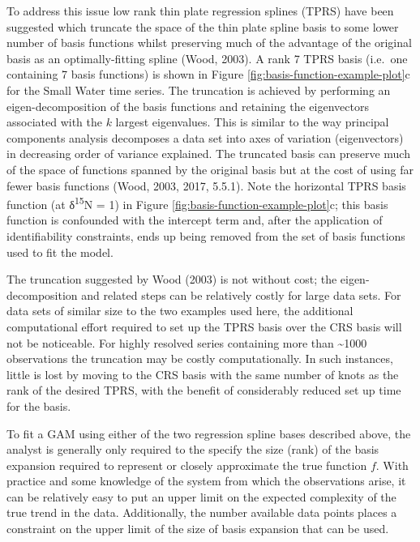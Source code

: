 \documentclass[12pt,]{article}
\begin{document}
To address this issue low rank thin plate regression splines (TPRS) have
been suggested which truncate the space of the thin plate spline basis
to some lower number of basis functions whilst preserving much of the
advantage of the original basis as an optimally-fitting spline (Wood,
2003). A rank 7 TPRS basis (i.e.~one containing 7 basis functions) is
shown in Figure \ref{fig:basis-function-example-plot}c for the Small
Water time series. The truncation is achieved by performing an
eigen-decomposition of the basis functions and retaining the
eigenvectors associated with the \(k\) largest eigenvalues. This is
similar to the way principal components analysis decomposes a data set
into axes of variation (eigenvectors) in decreasing order of variance
explained. The truncated basis can preserve much of the space of
functions spanned by the original basis but at the cost of using far
fewer basis functions (Wood, 2003, 2017, 5.5.1). Note the horizontal
TPRS basis function (at δ\textsuperscript{15}N = 1) in Figure
\ref{fig:basis-function-example-plot}c; this basis function is
confounded with the intercept term and, after the application of
identifiability constraints, ends up being removed from the set of basis
functions used to fit the model.

The truncation suggested by Wood (2003) is not without cost; the
eigen-decomposition and related steps can be relatively costly for large
data sets. For data sets of similar size to the two examples used here,
the additional computational effort required to set up the TPRS basis
over the CRS basis will not be noticeable. For highly resolved series
containing more than \textasciitilde{}1000 observations the truncation
may be costly computationally. In such instances, little is lost by
moving to the CRS basis with the same number of knots as the rank of the
desired TPRS, with the benefit of considerably reduced set up time for
the basis.

To fit a GAM using either of the two regression spline bases described
above, the analyst is generally only required to the specify the size
(rank) of the basis expansion required to represent or closely
approximate the true function \(f\). With practice and some knowledge of
the system from which the observations arise, it can be relatively easy
to put an upper limit on the expected complexity of the true trend in
the data. Additionally, the number available data points places a
constraint on the upper limit of the size of basis expansion that can be
used.
\end{document}
